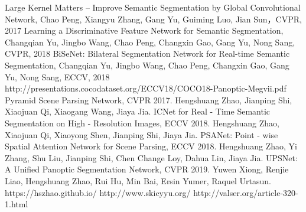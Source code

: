 \documentclass[UTF8]{ctexart}
\begin{document}
\renewcommand\refname{参考文献}
\begin{thebibliography}{99}
     Large Kernel Matters -- Improve Semantic Segmentation by Global Convolutional Network, Chao Peng, Xiangyu Zhang, Gang Yu, Guiming Luo, Jian Sun，CVPR, 2017
     Learning a Discriminative Feature Network for Semantic Segmentation, Changqian Yu, Jingbo Wang, Chao Peng, Changxin Gao, Gang Yu, Nong Sang, CVPR, 2018
     BiSeNet: Bilateral Segmentation Network for Real-time Semantic Segmentation, Changqian Yu, Jingbo Wang, Chao Peng, Changxin Gao, Gang Yu, Nong Sang, ECCV, 2018
     http://presentations.cocodataset.org/ECCV18/COCO18-Panoptic-Megvii.pdf
     Pyramid Scene Parsing Network, CVPR 2017. Hengshuang Zhao, Jianping Shi, Xiaojuan Qi, Xiaogang Wang, Jiaya Jia.
     ICNet for Real - Time Semantic Segmentation on High - Resolution Images, ECCV 2018. Hengshuang Zhao, Xiaojuan Qi, Xiaoyong Shen, Jianping Shi, Jiaya Jia.
    PSANet: Point - wise Spatial Attention Network for Scene Parsing, ECCV 2018. Hengshuang Zhao, Yi Zhang, Shu Liu, Jianping Shi, Chen Change Loy, Dahua Lin, Jiaya Jia.
     UPSNet: A Unified Panoptic Segmentation Network, CVPR 2019. Yuwen Xiong, Renjie Liao, Hengshuang Zhao, Rui Hu, Min Bai, Ersin Yumer, Raquel Urtasun.
     https://hszhao.github.io/
     http://www.skicyyu.org/
     http://valser.org/article-320-1.html
\end{thebibliography}


\ifx\allfiles\undefined
\end{document}
